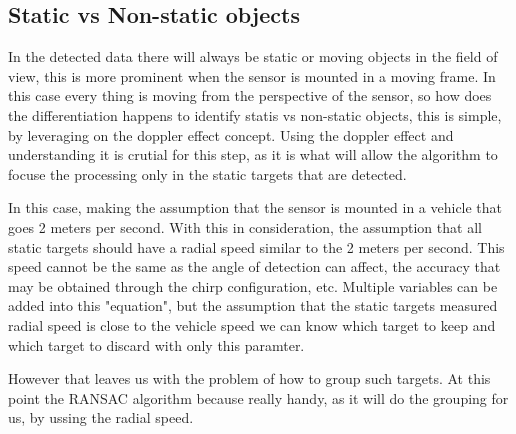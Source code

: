 \subsection{Static vs Non-static objects}
In the detected data there will always be static or moving objects in the field of view, this is more prominent when the sensor is mounted in a moving frame.
In this case every thing is moving from the perspective of the sensor, so how does the differentiation happens to identify statis vs non-static objects, this is simple, by leveraging on the doppler effect concept.
Using the doppler effect and understanding it is crutial for this step, as it is what will allow the algorithm to focuse the processing only in the static targets that are detected.

In this case, making the assumption that the sensor is mounted in a vehicle that goes 2 meters per second. With this in consideration, the assumption that all static targets should have a radial speed similar to the 2 meters per second.
This speed cannot be the same as the angle of detection can affect, the accuracy that may be obtained through the chirp configuration, etc.
Multiple variables can be added into this "equation", but the assumption that the static targets measured radial speed is close to the vehicle speed we can know which target to keep and which target to discard with only this paramter.

However that leaves us with the problem of how to group such targets. At this point the RANSAC algorithm because really handy, as it will do the grouping for us, by ussing the radial speed.

